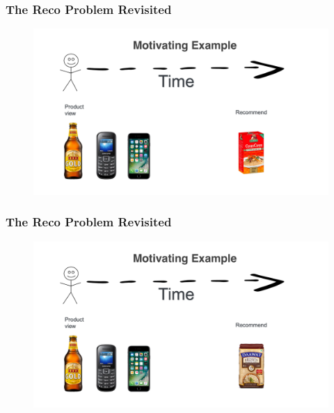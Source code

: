  \begin{frame}
  \frametitle{The Reco Problem Revisited}
 
 
   \begin{figure}[h!]
     \includegraphics[scale=0.3]{images/mot_ex3.png}
       \centering
       \label{motex1}
   \end{figure}
     
 \end{frame}

 \begin{frame}
  \frametitle{The Reco Problem Revisited}
 
 
   \begin{figure}[h!]
     \includegraphics[scale=0.3]{images/mot_ex4.png}
       \centering
       \label{motex1}
   \end{figure}
     
 \end{frame}




